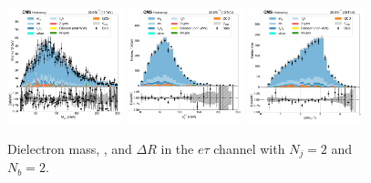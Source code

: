 \begin{figure}[htb!]
    \centering
    \includegraphics[width=0.3\textwidth]{chapters/Analysis/sectionPlots/figures/data_mc_overlays/etau_2016_cat_eq2_eq2_signal_linear_lepton_dilepton1_mass}
    \includegraphics[width=0.3\textwidth]{chapters/Analysis/sectionPlots/figures/data_mc_overlays/etau_2016_cat_eq2_eq2_signal_linear_lepton_dilepton1_pt}
    \includegraphics[width=0.3\textwidth]{chapters/Analysis/sectionPlots/figures/data_mc_overlays/etau_2016_cat_eq2_eq2_signal_linear_lepton_dilepton1_delta_r}
    \caption{Dielectron mass, \pt, and $\Delta R$ in the $e\tau$ channel
    with $N_{j} = 2$ and $N_{b} = 2$.}
    \label{fig:analysis:plots:etau_6_dilepton}
\end{figure}

